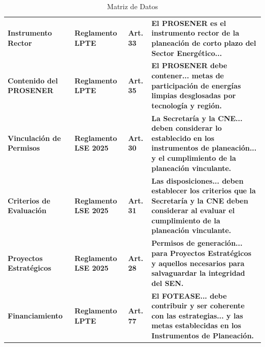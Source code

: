 \documentclass{cel}
\begin{document}
\vspace{0.3cm}
\begin{tabladoradoLargo}
\renewcommand{\tabularxcolumn}[1]{p{#1}}
\begin{xltabular}{\textwidth}{|X|X|X|X|}
\caption{Matriz de Datos} \\
\toprule
{}  &  &  &  \\
\midrule
\endhead
\textbf{Instrumento Rector} & \textbf{Reglamento LPTE} & \textbf{Art. 33} & \textbf{\textquotedbl{}El PROSENER es el instrumento rector de la planeación de corto plazo del Sector Energético...\textquotedbl{}} \\ \hline
\textbf{Contenido del PROSENER} & \textbf{Reglamento LPTE} & \textbf{Art. 35} & \textbf{\textquotedbl{}El PROSENER debe contener... metas de participación de energías limpias desglosadas por tecnología y región.\textquotedbl{}} \\ \hline
\textbf{Vinculación de Permisos} & \textbf{Reglamento LSE 2025} & \textbf{Art. 30} & \textbf{\textquotedbl{}La Secretaría y la CNE... deben considerar lo establecido en los instrumentos de planeación... y el cumplimiento de la planeación vinculante.\textquotedbl{}} \\ \hline
\textbf{Criterios de Evaluación} & \textbf{Reglamento LSE 2025} & \textbf{Art. 31} & \textbf{\textquotedbl{}Las disposiciones... deben establecer los criterios que la Secretaría y la CNE deben considerar al evaluar el cumplimiento de la planeación vinculante.\textquotedbl{}} \\ \hline
\textbf{Proyectos Estratégicos} & \textbf{Reglamento LSE 2025} & \textbf{Art. 28} & \textbf{\textquotedbl{}Permisos de generación... para Proyectos Estratégicos y aquellos necesarios para salvaguardar la integridad del SEN.\textquotedbl{}} \\ \hline
\textbf{Financiamiento} & \textbf{Reglamento LPTE} & \textbf{Art. 77} & \textbf{\textquotedbl{}El FOTEASE... debe contribuir y ser coherente con las estrategias... y las metas establecidas en los Instrumentos de Planeación.\textquotedbl{}} \\ \hline
\bottomrule
\end{xltabular}
\end{tabladoradoLargo}

\vspace{0.4cm}
\end{document}
